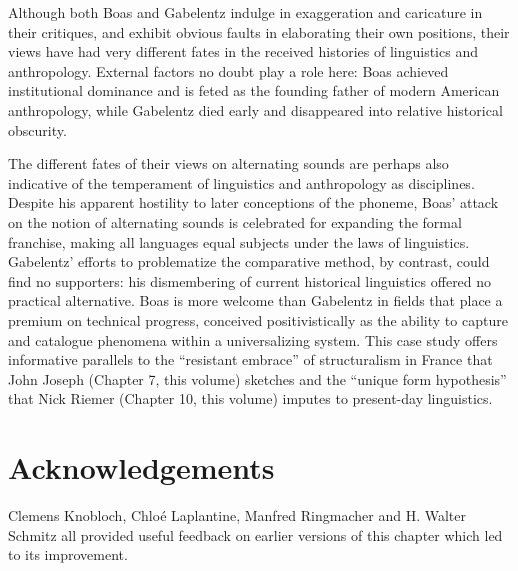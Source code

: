 \documentclass[output=paper]{langscibook}
\begin{document}
Although both Boas and Gabelentz indulge in exaggeration and caricature in their critiques, and exhibit obvious faults in elaborating their own positions, their views have had very different fates in the received histories of linguistics and anthropology. External factors no doubt play a role here: Boas achieved institutional dominance and is feted as the founding father of modern American anthropology, while Gabelentz died early and disappeared into relative historical obscurity. 

The different fates of their views on alternating sounds are perhaps also indicative of the temperament of linguistics and anthropology as disciplines. Despite his apparent hostility to later conceptions of the phoneme, Boas' attack on the notion of alternating sounds is celebrated for expanding the formal franchise, making all languages equal subjects under the laws of linguistics. Gabelentz' efforts to problematize the comparative method, by contrast, could find no supporters: his dismembering of current historical linguistics offered no practical alternative. Boas is more welcome than Gabelentz in fields that place a premium on technical progress, conceived positivistically as the ability to capture and catalogue phenomena within a universalizing system. This case study offers informative parallels to the ``resistant embrace'' of structuralism in France that John Joseph (Chapter 7, this volume) sketches and the ``unique form hypothesis'' that Nick Riemer (Chapter 10, this volume) imputes to present-day linguistics.

\section*{Acknowledgements}

Clemens Knobloch, Chloé Laplantine, Manfred Ringmacher and H. Walter Schmitz all provided useful feedback on earlier versions of this chapter which led to its improvement.

\sloppy
\printbibliography[heading=subbibliography,notkeyword=this]
\end{document}
